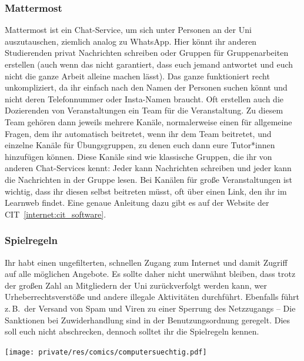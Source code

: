 \begin{multicols}{2}
\subsubsection{Mattermost}
Mattermost ist ein Chat-Service, um sich unter Personen an der Uni auszutauschen, ziemlich analog zu WhatsApp.
Hier könnt ihr anderen Studierenden privat Nachrichten schreiben oder Gruppen für Gruppenarbeiten erstellen (auch wenn das nicht garantiert, dass euch jemand antwortet und euch nicht die ganze Arbeit alleine machen lässt).
Das ganze funktioniert recht unkompliziert, da ihr einfach nach den Namen der Personen suchen könnt und nicht deren Telefonnummer oder Insta-Namen braucht.
Oft erstellen auch die Dozierenden von Veranstaltungen ein Team für die Veranstaltung.
Zu diesem Team gehören dann jeweils mehrere Kanäle, normalerweise einen für allgemeine Fragen, dem ihr automatisch beitretet, wenn ihr dem Team beitretet, und einzelne Kanäle für Übungsgruppen, zu denen euch dann eure Tutor*innen hinzufügen können.
Diese Kanäle sind wie klassische Gruppen, die ihr von anderen Chat-Services kennt: Jeder kann Nachrichten schreiben und jeder kann die Nachrichten in der Gruppe lesen.
Bei Kanälen für große Veranstaltungen ist wichtig, dass ihr diesen selbst beitreten müsst, oft über einen Link, den ihr im Learnweb findet.
Eine genaue Anleitung dazu gibt es auf der Website der CIT~\cref{internet:cit_software}.

\subsubsection{Spielregeln}
Ihr habt einen ungefilterten, schnellen Zugang zum Internet und damit Zugriff auf alle möglichen Angebote.
Es sollte daher nicht unerwähnt bleiben, dass trotz der großen Zahl an Mitgliedern der Uni zurückverfolgt werden kann, wer Urheberrechtsverstöße und andere illegale Aktivitäten durchführt.
Ebenfalls führt z.\,B.\ der Versand von Spam und Viren zu einer Sperrung des Netzzugangs -- Die Sanktionen bei Zuwiderhandlung sind in der Benutzungsordnung geregelt.
Dies soll euch nicht abschrecken, dennoch solltet ihr die Spielregeln kennen.

\begin{center}
	\texttt{[image: private/res/comics/computersuechtig.pdf]}
\end{center}


\end{multicols}

